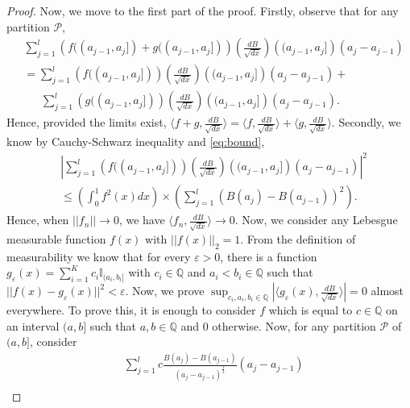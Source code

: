 \documentclass[10pt,a4paper]{amsart}
\begin{document}
\begin{proof}
\noindent 
Now, we move to the first part of the proof. Firstly, observe that for any partition $\mathcal{P}$,
\begin{equation}
\begin{split}
&\sum_{j=1}^{l} \left(f((a_{j-1},a_{j}])+g((a_{j-1},a_{j}])\right) \left( \frac{dB}{\sqrt{dx}} \right)\left((a_{j-1},a_{j}]\right)(a_{j}-a_{j-1})\\
&= \sum_{j=1}^{l}\left( f((a_{j-1},a_{j}]) \right)\left( \frac{dB}{\sqrt{dx}} \right)\left((a_{j-1},a_{j}]\right)(a_{j}-a_{j-1})+\\
&~~~~~~~ \sum_{j=1}^{l} \left( g((a_{j-1},a_{j}]) \right)\left( \frac{dB}{\sqrt{dx}} \right)\left((a_{j-1},a_{j}]\right)(a_{j}-a_{j-1}).
\end{split}
\end{equation}
Hence, provided the limits exist, $\langle f+g , \frac{dB}{\sqrt{dx}} \rangle = \langle f,  \frac{dB}{\sqrt{dx}}  \rangle + \langle g, \frac{dB}{\sqrt{dx}}  \rangle$. Secondly, we know by Cauchy-Schwarz inequality and \eqref{eq:bound}, 
\begin{equation}
\begin{split}
&\left|\sum_{j=1}^{l}\left( f((a_{j-1},a_{j}]) \right)\left( \frac{dB}{\sqrt{dx}} \right)\left((a_{j-1},a_{j}]\right)(a_{j}-a_{j-1})\right|^2 \\
& \le \left(\int_{0}^{1} f^{2}(x)dx \right)\times \left( \sum_{j=1}^{l} \left(B(a_{j})-B(a_{j-1})\right)^2 \right).
\end{split}
\end{equation}
Hence, when $||f_{n}|| \to 0 $, we have $\langle f_{n}, \frac{dB}{\sqrt{dx}} \rangle  \to 0$.
Now, we consider any Lebesgue measurable function $f(x)$ with $||f(x)||_{2}=1$. From the definition of measurability we know that for every $\varepsilon >0$, there is a function $g_{\varepsilon}(x)= \sum_{i=1}^{K} c_{i} \mathbb{I}_{(a_{i},b_{i}]}$ 
with $c_{i} \in \mathbb{Q}$ and $a_{i}< b_{i} \in \mathbb{Q}$ such that $|| f(x)- g_{\varepsilon}(x) ||^2 < \varepsilon$. Now, we prove $\sup_{c_{i},a_{i},b_{i} \in \mathbb{Q}}\left|\langle g_{\varepsilon}(x) , \frac{dB}{\sqrt{dx}}\rangle\right|=0$ almost everywhere.
To prove this, it is enough to consider $f$ which is equal to $c \in \mathbb{Q}$ on an interval $(a,b]$ such that $a,b \in \mathbb{Q}$ and $0$ otherwise.
Now, for any partition $\mathcal{P}$ of $(a,b]$, consider
\begin{equation}
\begin{split}
&\sum_{j=1}^{l} c \frac{B(a_{j})-B(a_{j-1})}{\left(a_{j}-a_{j-1}\right)^{\frac{1}{2}}}(a_{j}-a_{j-1})\\

\end{split}
\end{equation}
\end{proof}
\end{document}
